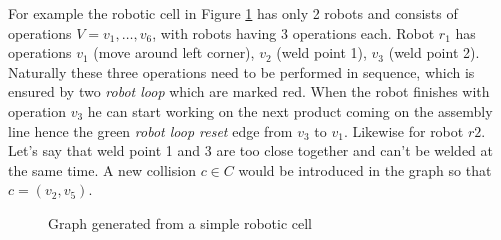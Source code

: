 For example the robotic cell in Figure \ref{fig:examplegraph} has only 2 robots and consists of operations $V = v_1, \dots, v_6$, with robots having 3 operations each. 
Robot $r_1$ has operations $v_1$ (move around left corner), $v_2$ (weld point 1), $v_3$ (weld point 2). 
Naturally these three operations need to be performed in sequence, which is ensured by two  \emph{robot loop} which are marked red. 
When the robot finishes with operation $v_3$ he can start working on the next product coming on the assembly line hence the green \emph{robot loop reset} edge from $v_3$ to $v_1$. 
Likewise for robot $r2$. Let's say that weld point 1 and 3 are too close together and can't be welded at the same time. A new collision $c \in C$ would be introduced in the graph so that $c = (v_2, v_5)$.

\begin{figure}
    \centering
    
    \caption{Graph generated from a simple robotic cell}
    \label{fig:examplegraph}
\end{figure}
